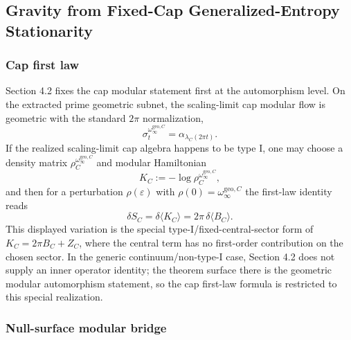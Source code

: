 \subsection{Gravity from Fixed-Cap Generalized-Entropy Stationarity}\label{5-gravity-from-entanglement-equilibrium}

\subsubsection{Cap first law}\label{51-cap-first-law}

Section 4.2 fixes the cap modular statement first at the automorphism level. On the extracted prime geometric subnet, the scaling-limit cap modular flow is geometric with the standard \(2\pi\) normalization,
\[
\sigma_t^{\omega_\infty^{\mathrm{geo},C}}
=
\alpha_{\lambda_C(2\pi t)}.
\]
If the realized scaling-limit cap algebra happens to be type I, one may choose a density matrix \(\rho_C^{\omega_\infty^{\mathrm{geo},C}}\) and modular Hamiltonian
\[
K_C:=-\log\rho_C^{\omega_\infty^{\mathrm{geo},C}},
\]
and then for a perturbation \(\rho(\varepsilon)\) with \(\rho(0)=\omega_\infty^{\mathrm{geo},C}\) the first-law identity reads
\[
\delta S_C=\delta\langle K_C\rangle
=
2\pi\,\delta\langle B_C\rangle.
\]
This displayed variation is the special type-I/fixed-central-sector form of
\(K_C=2\pi B_C+Z_C\), where the central term has no first-order contribution on the chosen
sector. In the generic continuum/non-type-I case, Section 4.2 does not supply an inner operator
identity; the theorem surface there is the geometric modular automorphism statement, so the cap
first-law formula is restricted to this special realization.

\subsubsection{Null-surface modular bridge}\label{52-null-surface-modular-bridge}

